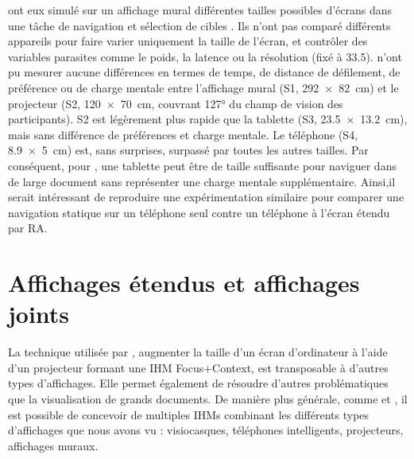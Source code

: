 
\cite{Raedle2014} ont eux simulé sur un affichage mural différentes tailles possibles d'écrans  dans une tâche de navigation et sélection de cibles . Ils n'ont pas comparé différents appareils pour faire varier uniquement la taille de l'écran, et contrôler des variables parasites comme le poids, la latence ou la résolution (fixé à \SI{33.5}{\ppi}). \citeauthor{Raedle2014} n'ont pu mesurer aucune différences en termes de temps, de distance de défilement, de préférence ou de charge mentale entre l'affichage mural (S1, \SI{292x82}{\cm}) et le projecteur (S2, \SI{120x70}{\cm}, couvrant \ang{127} du champ de vision des participants). S2 est légèrement plus rapide que la tablette (S3, \SI{23.5x13.2}{\cm}), mais sans différence de préférences et charge mentale. Le téléphone (S4, \SI{8.9x5}{\cm}) est, sans surprises, surpassé par toutes les autres tailles. Par conséquent, pour \citeauthor{Raedle2014}, une tablette peut être de taille suffisante pour naviguer dans de large document sans représenter une charge mentale supplémentaire. Ainsi,il serait intéressant de reproduire une expérimentation similaire pour comparer une navigation statique sur un téléphone seul contre un téléphone à l'écran étendu par RA.


\section{Affichages étendus et affichages joints}
\label{subsec:litterature_extended_screens}

La technique utilisée par \cite{Baudisch2002}, augmenter la taille d'un écran d'ordinateur à l'aide d'un projecteur formant une IHM Focus+Context, est transposable à d'autres types d'affichages. Elle permet également de résoudre d'autres problématiques que la visualisation de grands documents. De manière plus générale, comme \cite{Grubert2015} et \cite{Serrano2015}, il est possible de concevoir de multiples IHMs combinant les différents types d'affichages que nous avons vu : visiocasques, téléphones intelligents, projecteurs, affichages muraux.

